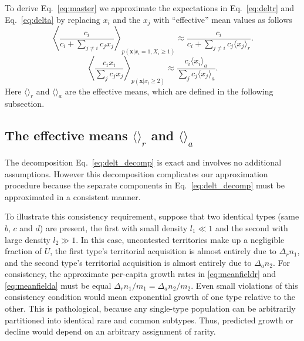 \documentclass[12pt]{article}
\begin{document}
To derive Eq.~\eqref{eq:master} we approximate the expectations in Eq.~\eqref{eq:deltr} and Eq.~\eqref{eq:delta} by replacing $x_i$ and the $x_j$ with ``effective'' mean values as follows 
\begin{equation}
\left\langle\frac{c_i}{c_i +\sum_{j\neq i} c_j x_j}\right\rangle_{p({\mathbf x}|x_i=1,X_i\geq 1)}\approx \frac{c_i}{c_i +\sum_{j\neq i} c_j \langle x_j\rangle_r}.\label{eq:meanfieldr}
\end{equation}
\begin{equation}
\left\langle \frac{c_i x_i}{\sum_j c_j x_j} \right\rangle_{p({\mathbf x}|x_i\geq 2)}\approx  \frac{c_i \langle x_i \rangle_a}{\sum_j c_j \langle x_j\rangle_a}.\label{eq:meanfielda}
\end{equation}
Here $\langle \rangle_r$ and $\langle \rangle_a$ are the effective means, which are defined in the following subsection. 

\subsection*{The effective means $\langle \rangle_r$ and $\langle \rangle_a$}

The decomposition Eq.~\eqref{eq:delt_decomp} is exact and involves no additional assumptions. However this decomposition complicates our approximation procedure because the separate components in Eq.~\eqref{eq:delt_decomp} must be approximated in a consistent manner. 

To illustrate this consistency requirement, suppose that two identical types (same $b$, $c$ and $d$) are present, the first with small density $l_1\ll 1$ and the second with large density $l_2 \gg 1$. In this case, uncontested territories make up a negligible fraction of $U$, the first type's territorial acquisition is almost entirely due to $\Delta_r n_1$, and the second type's territorial acquisition is almost entirely due to $\Delta_a n_2$. For consistency, the approximate per-capita growth rates in \eqref{eq:meanfieldr} and \eqref{eq:meanfielda} must be equal $\Delta_r n_1/m_1 = \Delta_a n_2/m_2$. Even small violations of this consistency condition would mean exponential growth of one type relative to the other. This is pathological, because any single-type population can be arbitrarily partitioned into identical rare and common subtypes. Thus, predicted growth or decline would depend on an arbitrary assignment of rarity.
\end{document}
